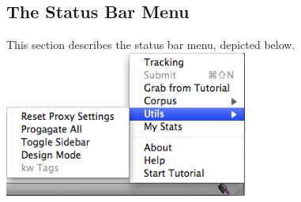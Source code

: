 \documentclass[12pt,a4paper]{article}
\begin{document}
\subsection{The Status Bar Menu}

This section describes the status bar menu, depicted below. \\

\includegraphics[width=0.6\textwidth]{images/stsbrmenu.png}
\medskip
\end{document}

